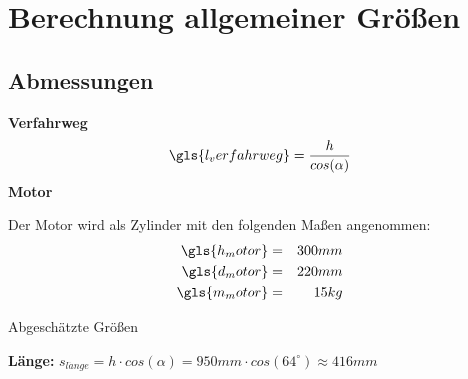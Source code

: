 \documentclass[../main.tex]{subfiles}
\begin{document}
    \section{Berechnung allgemeiner Größen}
    \subsection{Abmessungen}
    \raggedright
    \textbf{Verfahrweg} 
    \begin{equation*}
        \gls{l_verfahrweg} = \frac{h}{cos(\alpha)} 
    \end{equation*}
    \textbf{Motor}

    Der Motor wird als Zylinder mit den folgenden Maßen angenommen:
    \begin{equation*}
        \begin{aligned}
            \gls{h_motor} & = & 300mm \\
            \gls{d_motor} & = & 220mm \\
            \gls{m_motor} & = & 15kg
        \end{aligned}
    \end{equation*}

    Abgeschätzte Größen

    

    \textbf{Länge:}
        $ s_{l\ddot{a}nge} = h\cdot cos(\alpha) = 950mm \cdot cos(64^\circ) \approx 416mm$
    \newpage
\end{document}
